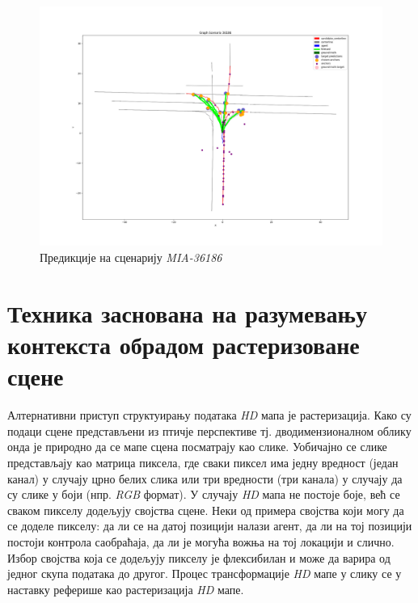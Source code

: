 \documentclass[11pt,oneside]{memoir}
\begin{document}
\begin{figure}[H]
  \centering
  \includegraphics[width=1.0\textwidth]{images/result_PIT_36186_scenario.png}
  \caption{Предикције на сценарију \textit{MIA-36186} \label{tnt-MIA-36186}}
\end{figure}

\chapter{Техника заснована на разумевању контекста обрадом растеризоване сцене}
\label{chp:razrada}

Алтернативни приступ структуирању података \textit{HD} мапа је растеризација. Како су подаци
сцене представљени из птичје перспективе тј. дводимензионалном облику онда је природно да се мапе сцена посматрају као слике. 
Уобичајно се слике представљају као матрица пиксела, где сваки пиксел има једну вредност (један канал) у случају црно белих слика или 
три вредности (три канала) у случају да су слике у боји (нпр. \textit{RGB} формат). У случају \textit{HD}
мапа не постоје боје, већ се сваком пикселу додељују својства сцене. Неки од примера својства који могу 
да се доделе пикселу: да ли се на датој позицији налази агент,
да ли на тој позицији постоји контрола саобраћаја, да ли је могућа вожња на тој локацији и слично. Избор својства која се додељују
пикселу је флексибилан и може да варира од једног скупа података до другог.
Процес трансформације \textit{HD} мапе у слику се у наставку реферише као растеризација \textit{HD} мапе. 
\end{document}
